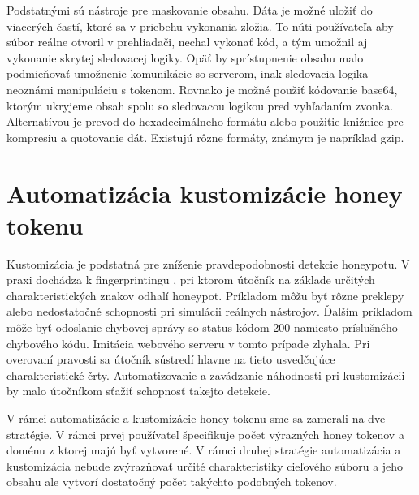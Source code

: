 \documentclass[conference, 11pt,slovak,a4paper,twoside]{IEEEtran}
\begin{document}
Podstatnými sú nástroje pre maskovanie obsahu. Dáta je možné uložiť do viacerých častí, ktoré sa v priebehu vykonania zložia. To núti používateľa aby súbor reálne otvoril v prehliadači, nechal vykonať kód, a tým umožnil aj vykonanie skrytej sledovacej logiky. Opäť by sprístupnenie obsahu malo podmieňovať umožnenie komunikácie so serverom, inak sledovacia logika neoznámi manipuláciu s tokenom. Rovnako je možné použiť kódovanie base64, ktorým ukryjeme obsah spolu so sledovacou logikou pred vyhľadaním zvonka. Alternatívou je prevod do hexadecimálneho formátu alebo použitie knižnice pre kompresiu a quotovanie dát. Existujú rôzne formáty, známym je napríklad gzip. 


\section{Automatizácia kustomizácie honey tokenu} \label{automatizationOfHoneyTokenCustomization}

Kustomizácia je podstatná pre zníženie pravdepodobnosti detekcie honeypotu. V praxi dochádza k fingerprintingu \cite{mohammed_honeypots_2015}, pri ktorom útočník na základe určitých charakteristických znakov odhalí honeypot. Príkladom môžu byť rôzne preklepy alebo nedostatočné schopnosti pri simulácii reálnych nástrojov. Ďalším príkladom môže byť odoslanie chybovej správy so status kódom 200 namiesto príslušného chybového kódu. Imitácia webového serveru v tomto prípade zlyhala. Pri overovaní pravosti sa útočník sústredí hlavne na tieto usvedčujúce charakteristické črty. Automatizovanie a zavádzanie náhodnosti pri kustomizácii by malo útočníkom sťažiť schopnosť takejto detekcie.

V rámci automatizácie a kustomizácie honey tokenu sme sa zamerali na dve stratégie. V rámci prvej používateľ špecifikuje počet výrazných honey tokenov a doménu z ktorej majú byť vytvorené. V rámci druhej stratégie automatizácia a kustomizácia nebude zvýrazňovať určité charakteristiky cieľového súboru a jeho obsahu ale vytvorí dostatočný počet takýchto podobných tokenov.
\end{document}
